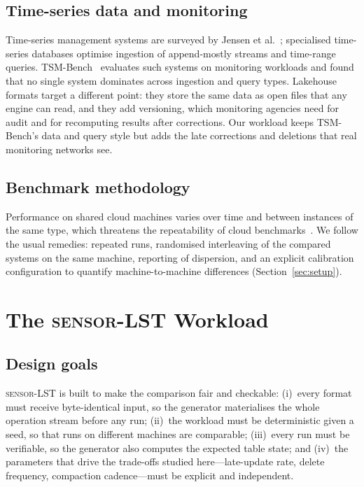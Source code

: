 \documentclass[conference]{IEEEtran}
\newcommand{\sys}{\textsc{sensor-LST}}
\begin{document}
\subsection{Time-series data and monitoring}
Time-series management systems are surveyed by Jensen et al.~\cite{jensen2017tsms}; specialised time-series databases
optimise ingestion of append-mostly streams and time-range queries. TSM-Bench~\cite{khelifati2023tsmbench} evaluates
such systems on monitoring workloads and found that no single system dominates across ingestion and query types.
Lakehouse formats target a different point: they store the same data as open files that any engine can read, and they
add versioning, which monitoring agencies need for audit and for recomputing results after corrections. Our workload
keeps TSM-Bench's data and query style but adds the late corrections and deletions that real monitoring networks see.

\subsection{Benchmark methodology}
Performance on shared cloud machines varies over time and between instances of the same type, which threatens the
repeatability of cloud benchmarks~\cite{leitner2016chaos,uta2020reproducible}. We follow the usual remedies: repeated
runs, randomised interleaving of the compared systems on the same machine, reporting of dispersion, and an explicit
calibration configuration to quantify machine-to-machine differences (Section~\ref{sec:setup}).

\section{The \sys{} Workload}\label{sec:workload}
\subsection{Design goals}
\sys{} is built to make the comparison fair and checkable: (i)~every format must receive byte-identical input, so the
generator materialises the whole operation stream before any run; (ii)~the workload must be deterministic given a seed,
so that runs on different machines are comparable; (iii)~every run must be verifiable, so the generator also computes
the expected table state; and (iv)~the parameters that drive the trade-offs studied here---late-update rate, delete
frequency, compaction cadence---must be explicit and independent.
\end{document}
